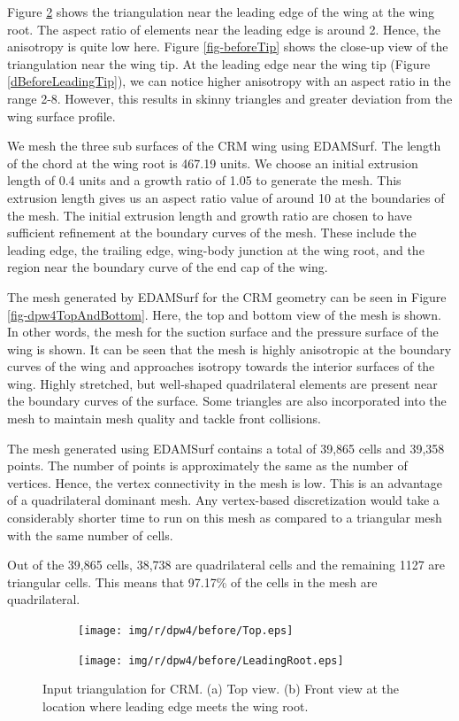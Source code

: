 Figure \ref{dBeforeLeadingRoot} shows the triangulation near the leading edge of the wing at the wing root. The aspect ratio of elements near the leading edge is around 2. Hence, the anisotropy is quite low here. Figure \ref{fig-beforeTip} shows the close-up view of the triangulation near the wing tip. At the leading edge near the wing tip (Figure \ref{dBeforeLeadingTip}), we can notice higher anisotropy with an aspect ratio in the range 2-8. However, this results in skinny triangles and greater deviation from the wing surface profile.

We mesh the three sub surfaces of the CRM wing using EDAMSurf. The length of the chord at the wing root is 467.19 units. We choose an initial extrusion length of 0.4 units and a growth ratio of 1.05 to generate the mesh. This extrusion length gives us an aspect ratio value of around 10 at the boundaries of the mesh. The initial extrusion length and growth ratio are chosen to have sufficient refinement at the boundary curves of the mesh. These include the leading edge, the trailing edge, wing-body junction at the wing root, and the region near the boundary curve of the end cap of the wing.

The mesh generated by EDAMSurf for the CRM geometry can be seen in Figure \ref{fig-dpw4TopAndBottom}. Here, the top and bottom view of the mesh is shown. In other words, the mesh for the suction surface and the pressure surface of the wing is shown. It can be seen that the mesh is highly anisotropic at the boundary curves of the wing and approaches isotropy towards the interior surfaces of the wing. Highly stretched, but well-shaped quadrilateral elements are present near the boundary curves of the surface. Some triangles are also incorporated into the mesh to maintain mesh quality and tackle front collisions.

The mesh generated using EDAMSurf contains a total of 39,865 cells and 39,358 points. The number of points is approximately the same as the number of vertices. Hence, the vertex connectivity in the mesh is low. This is an advantage of a quadrilateral dominant mesh. Any vertex-based discretization would take a considerably shorter time to run on this mesh as compared to a triangular mesh with the same number of cells.

Out of the 39,865 cells, 38,738 are quadrilateral cells and the remaining 1127 are triangular cells. This means that 97.17\% of the cells in the mesh are quadrilateral.



\begin{figure}[!hbt]
	\centering
	\begin{subfigure}{\textwidth}
		\centering
		\texttt{[image: img/r/dpw4/before/Top.eps]}
		\caption{}
		\label{dBeforeTop}
	\end{subfigure}
	\begin{subfigure}{\textwidth}
		\centering
		\texttt{[image: img/r/dpw4/before/LeadingRoot.eps]}
		\caption{}
		\label{dBeforeLeadingRoot}
	\end{subfigure}
	\caption[Input triangulation for CRM.]{Input triangulation for CRM. (a) Top view. (b) Front view at the location where leading edge meets the wing root.}
	\label{fig-beforeTop}
\end{figure}

